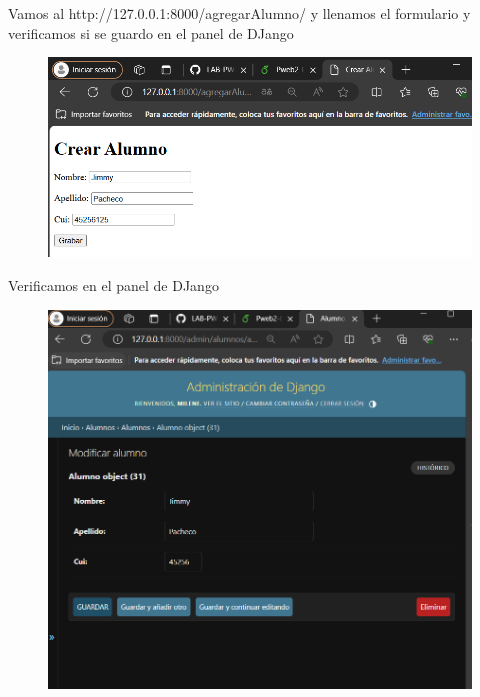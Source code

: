 \documentclass{article}
\begin{document}
 \item Vamos al http://127.0.0.1:8000/agregarAlumno/ y llenamos el formulario y verificamos si se guardo en el panel de DJango

     \begin{figure}[H]
           \centering
           \includegraphics[scale=0.6]{latex/img/img6.png}
     \end{figure}
     
 \item Verificamos en el panel de DJango

     \begin{figure}[H]
           \centering
           \includegraphics[scale=0.6]{latex/img/img7.png}
     \end{figure}
\end{document}
